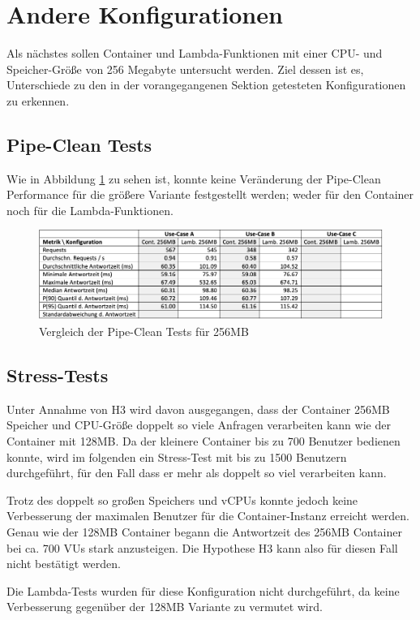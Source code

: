 \section{Andere Konfigurationen}
Als nächstes sollen Container und Lambda-Funktionen mit einer CPU- und Speicher-Größe von 256 Megabyte untersucht werden. Ziel dessen ist es, Unterschiede zu den in der vorangegangenen Sektion getesteten Konfigurationen zu erkennen.

\subsection{Pipe-Clean Tests}
Wie in Abbildung \ref{fig:pipe256-comparison} zu sehen ist, konnte keine Veränderung der Pipe-Clean Performance für die größere Variante festgestellt werden; weder für den Container noch für die Lambda-Funktionen.
\begin{figure}[H]
    \includegraphics[width=\textwidth]{img/pipe256-comparison.png}
    \caption[Vergleich der Pipe-Clean Tests für 256MB]{Vergleich der Pipe-Clean Tests für 256MB}
    \label{fig:pipe256-comparison}
\end{figure}

\subsection{Stress-Tests}
Unter Annahme von H3 wird davon ausgegangen, dass der Container 256MB Speicher und CPU-Größe doppelt so viele Anfragen verarbeiten kann wie der Container mit 128MB. Da der kleinere Container bis zu 700 Benutzer bedienen konnte, wird im folgenden ein Stress-Test mit bis zu 1500 Benutzern durchgeführt, für den Fall dass er mehr als doppelt so viel verarbeiten kann.

Trotz des doppelt so großen Speichers und vCPUs konnte jedoch keine Verbesserung der maximalen Benutzer für die Container-Instanz erreicht werden. Genau wie der 128MB Container begann die Antwortzeit des 256MB Container bei ca. 700 VUs stark anzusteigen. Die Hypothese H3 kann also für diesen Fall nicht bestätigt werden.

Die Lambda-Tests wurden für diese Konfiguration nicht durchgeführt, da keine Verbesserung gegenüber der 128MB Variante zu vermutet wird.


